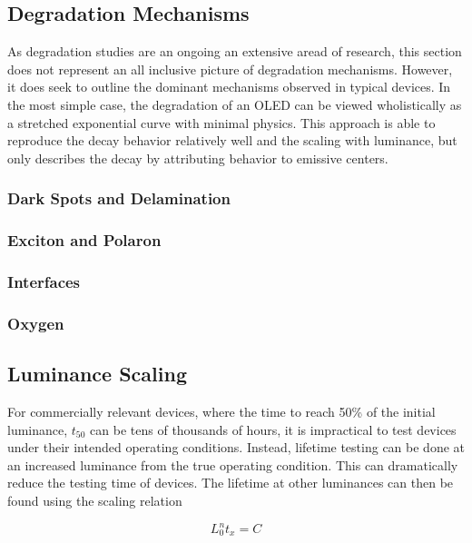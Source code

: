 \documentclass[../thesis.tex]{subfiles}
\begin{document}
\subsection{Degradation Mechanisms}\label{sec:degradation_mechanisms}

As degradation studies are an ongoing an extensive aread of research, this section does not represent an all inclusive picture of degradation mechanisms.  However, it does seek to outline the dominant mechanisms observed in typical devices.
In the most simple case, the degradation of an OLED can be viewed wholistically as a stretched exponential curve with minimal physics.\supercite{Scholz2015,Fry2005a}
This approach is able to reproduce the decay behavior relatively well and the scaling with luminance, but only describes the decay by attributing behavior to emissive centers.

\subsubsection{Dark Spots and Delamination}



\subsubsection{Exciton and Polaron}
\subsubsection{Interfaces}
\subsubsection{Oxygen}


\subsection{Luminance Scaling}\label{sec:luminance_scaling}
For commercially relevant devices, where the time to reach 50\% of the initial luminance, $t_{50}$ can be tens of thousands of hours, it is impractical to test devices under their intended operating conditions.
Instead, lifetime testing can be done at an increased luminance from the true operating condition.\supercite{Scholz2015}
This can dramatically reduce the testing time of devices.
The lifetime at other luminances can then be found using the scaling relation

\begin{equation}
L_0^n t_x=C
\label{eqn:luminance_scaling}
\end{equation}
\end{document}
